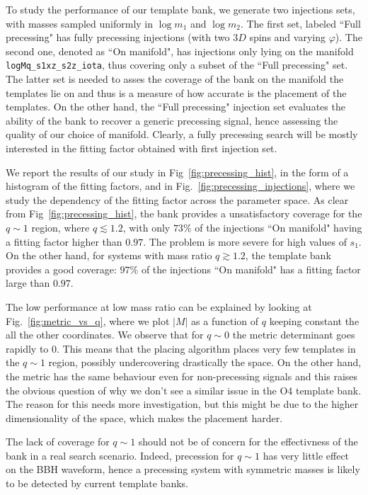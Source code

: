 \documentclass[twocolumn,showpacs,preprintnumbers,nofootinbib,prd,
superscriptaddress,10pt]{revtex4-2}
\begin{document}
To study the performance of our template bank, we generate two injections sets, with masses sampled uniformly in $\log m_1$ and $\log m_2$.
The first set, labeled ``Full precessing" has fully precessing injections (with two $3D$ spins and varying $\varphi$). The second one, denoted as ``On manifold", has injections only lying on the manifold \texttt{logMq\_s1xz\_s2z\_iota}, thus covering only a subset of the ``Full precessing" set.
The latter set is needed to asses the coverage of the bank on the manifold the templates lie on and thus is a measure of how accurate is the placement of the templates.
On the other hand, the ``Full precessing" injection set evaluates the ability of the bank to recover a generic precessing signal, hence assessing the quality of our choice of manifold.
Clearly, a fully precessing search will be mostly interested in the fitting factor obtained with first injection set.

We report the results of our study in Fig~\ref{fig:precessing_hist}, in the form of a histogram of the fitting factors, and in Fig.~\ref{fig:precessing_injections}, where we study the dependency of the fitting factor across the parameter space.
As clear from Fig~\ref{fig:precessing_hist}, the bank provides a unsatisfactory coverage for the $q\sim 1$ region, where $q \lesssim 1.2$, with only $73\%$ of the injections ``On manifold" having a fitting factor higher than $0.97$. The problem is more severe for high values of $s_1$.
On the other hand, for systems with mass ratio $q \gtrsim 1.2$, the template bank provides a good coverage: $97\%$ of the injections ``On manifold" has a fitting factor large than $0.97$.

The low performance at low mass ratio can be explained by looking at Fig.~\ref{fig:metric_vs_q}, where we plot $|M|$ as a function of $q$ keeping constant the all the other coordinates. We observe that for $q \sim 0$ the metric determinant goes rapidly to $0$. This means that the placing algorithm places very few templates in the $q\sim 1$ region, possibly undercovering drastically the space. On the other hand, the metric has the same behaviour even for non-precessing signals and this raises the obvious question of why we don't see a similar issue in the O4 template bank. The reason for this needs more investigation, but this might be due to the higher dimensionality of the space, which makes the placement harder.

The lack of coverage for $q\sim 1$ should not be of concern for the effectivness of the bank in a real search scenario. Indeed, precession for $q\sim 1$ has very little effect on the BBH waveform, hence a precessing system with symmetric masses is likely to be detected by current template banks.
\end{document}
